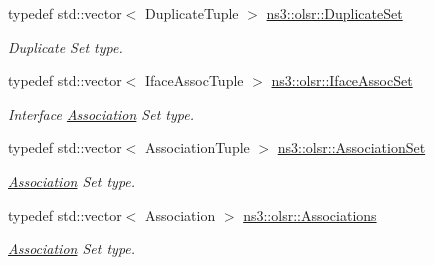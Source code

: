 \begin{DoxyCompactItemize}
typedef std\+::vector$<$ Duplicate\+Tuple $>$ \hyperlink{namespacens3_1_1olsr_aef00689fee8c925dd464c5d1fee0dee9}{ns3\+::olsr\+::\+Duplicate\+Set}
\begin{DoxyCompactList}\small\item\em Duplicate Set type. \end{DoxyCompactList}\item 
typedef std\+::vector$<$ Iface\+Assoc\+Tuple $>$ \hyperlink{namespacens3_1_1olsr_af7456b9ea2cde8c7d88443de06c015f4}{ns3\+::olsr\+::\+Iface\+Assoc\+Set}
\begin{DoxyCompactList}\small\item\em Interface \hyperlink{structns3_1_1olsr_1_1Association}{Association} Set type. \end{DoxyCompactList}\item 
typedef std\+::vector$<$ Association\+Tuple $>$ \hyperlink{namespacens3_1_1olsr_a35c0d7e5a941dd49e212f0c9e81ba466}{ns3\+::olsr\+::\+Association\+Set}
\begin{DoxyCompactList}\small\item\em \hyperlink{structns3_1_1olsr_1_1Association}{Association} Set type. \end{DoxyCompactList}\item 
typedef std\+::vector$<$ Association $>$ \hyperlink{namespacens3_1_1olsr_a7aefab4ffae5b289262125647510a2ef}{ns3\+::olsr\+::\+Associations}
\begin{DoxyCompactList}\small\item\em \hyperlink{structns3_1_1olsr_1_1Association}{Association} Set type. \end{DoxyCompactList}\end{DoxyCompactItemize}
